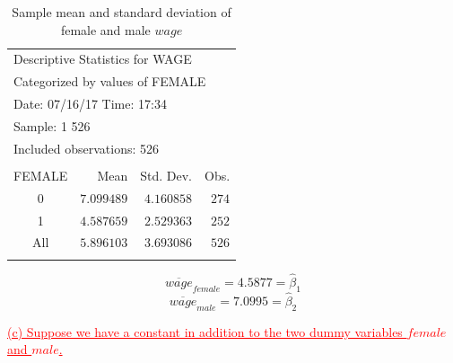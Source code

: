 \documentclass[12pt]{report}
\begin{document}
\vspace{-\baselineskip}
\begin{table}[H]
	\centering
	\begin{tabular}{lrrr}
		\multicolumn{4}{l}{Descriptive Statistics for WAGE}\\
		\multicolumn{4}{l}{Categorized by values of FEMALE}\\
		\multicolumn{3}{l}{Date: 07/16/17   Time: 17:34}&\multicolumn{1}{c}{}\\
		\multicolumn{2}{l}{Sample: 1 526}&\multicolumn{1}{c}{}&\multicolumn{1}{c}{}\\
		\multicolumn{3}{l}{Included observations: 526}&\multicolumn{1}{c}{}\\
		[4.5pt] \hline \\ [-4.5pt]
		\multicolumn{1}{c|}{FEMALE}&\multicolumn{1}{r}{Mean}&\multicolumn{1}{r}{Std. Dev.}&\multicolumn{1}{r}{Obs.}\\
		\multicolumn{1}{c|}{0}&\multicolumn{1}{r}{$7.099489$}&\multicolumn{1}{r}{$4.160858$}&\multicolumn{1}{r}{$274$}\\
		\multicolumn{1}{c|}{1}&\multicolumn{1}{r}{$4.587659$}&\multicolumn{1}{r}{$2.529363$}&\multicolumn{1}{r}{$252$}\\
		\multicolumn{1}{c|}{All}&\multicolumn{1}{r}{$5.896103$}&\multicolumn{1}{r}{$3.693086$}&\multicolumn{1}{r}{$526$}\\
		[4.5pt] \hline \\ [-4.5pt]
	\end{tabular}
	\caption{Sample mean and standard deviation of female and male $wage$}
\end{table}

\vspace{-\baselineskip}
$$\overline{wage}_{female} = 4.5877 = \hat{\beta}_1 $$
$$\overline{wage}_{male} = 7.0995 = \hat{\beta}_2$$

\noindent \textcolor{red}
{
	\ul{(c) Suppose we have a constant in addition to the two dummy variables $female$ and $male$.}
}
\end{document}
